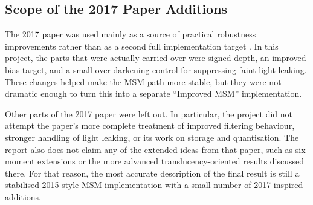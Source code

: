\subsection{Scope of the 2017 Paper Additions}

The 2017 paper was used mainly as a source of practical robustness improvements rather than as a second full implementation target \cite{peters2017improved}. In this project, the parts that were actually carried over were signed depth, an improved bias target, and a small over-darkening control for suppressing faint light leaking. These changes helped make the MSM path more stable, but they were not dramatic enough to turn this into a separate ``Improved MSM'' implementation.

Other parts of the 2017 paper \cite{peters2017improved} were left out. In particular, the project did not attempt the paper's more complete treatment of improved filtering behaviour, stronger handling of light leaking, or its work on storage and quantisation. The report also does not claim any of the extended ideas from that paper, such as six-moment extensions or the more advanced translucency-oriented results discussed there. For that reason, the most accurate description of the final result is still a stabilised 2015-style MSM implementation \cite{peters2015msm} with a small number of 2017-inspired additions.
